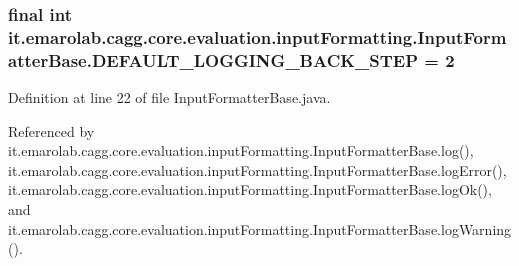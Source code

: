 \hypertarget{classit_1_1emarolab_1_1cagg_1_1core_1_1evaluation_1_1inputFormatting_1_1InputFormatterBase_ab1f65b76eb468d3c59c35ac207859fdd}{
\subsubsection[{D\-E\-F\-A\-U\-L\-T\-\_\-\-L\-O\-G\-G\-I\-N\-G\-\_\-\-B\-A\-C\-K\-\_\-\-S\-T\-E\-P}]{\setlength{\rightskip}{0pt plus 5cm}final int it.\-emarolab.\-cagg.\-core.\-evaluation.\-input\-Formatting.\-Input\-Formatter\-Base.\-D\-E\-F\-A\-U\-L\-T\-\_\-\-L\-O\-G\-G\-I\-N\-G\-\_\-\-B\-A\-C\-K\-\_\-\-S\-T\-E\-P = 2\hspace{0.3cm}{\ttfamily [static]}}}\label{classit_1_1emarolab_1_1cagg_1_1core_1_1evaluation_1_1inputFormatting_1_1InputFormatterBase_ab1f65b76eb468d3c59c35ac207859fdd}


Definition at line 22 of file Input\-Formatter\-Base.\-java.



Referenced by it.\-emarolab.\-cagg.\-core.\-evaluation.\-input\-Formatting.\-Input\-Formatter\-Base.\-log(), it.\-emarolab.\-cagg.\-core.\-evaluation.\-input\-Formatting.\-Input\-Formatter\-Base.\-log\-Error(), it.\-emarolab.\-cagg.\-core.\-evaluation.\-input\-Formatting.\-Input\-Formatter\-Base.\-log\-Ok(), and it.\-emarolab.\-cagg.\-core.\-evaluation.\-input\-Formatting.\-Input\-Formatter\-Base.\-log\-Warning().

